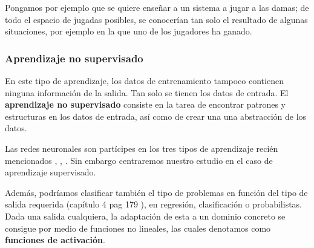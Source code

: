 Pongamos por ejemplo que se quiere enseñar a un sistema a jugar
a las damas; de todo el espacio de jugadas posibles, se conocerían tan solo el resultado de algunas situaciones, por ejemplo en la que uno de los jugadores ha ganado.  

\subsubsection{Aprendizaje no supervisado}  

En este tipo de aprendizaje, los datos de entrenamiento tampoco contienen ninguna información de la salida.
 Tan solo se tienen los datos de entrada. El \textbf{aprendizaje no supervisado} 
 consiste en la tarea de encontrar patrones y estructuras en los datos de entrada, 
 así como de crear una una abstracción de los datos.  


Las redes neuronales son partícipes en los tres tipos de aprendizaje 
recién mencionados
\cite{8612259}, \cite{DBLP:journals/corr/BakerGNR16}, \cite{10.5555/2955491.2955578}. Sin embargo centraremos nuestro estudio en el caso 
de aprendizaje supervisado. 

Además, podríamos clasificar también el tipo de problemas en función del tipo de salida requerida (capítulo 4 pag 179
\cite{BishopPaterRecognition}), en regresión, clasificación o probabilistas. 
Dada una salida cualquiera, la adaptación de esta a un dominio concreto se consigue por medio de funciones 
no lineales, las cuales denotamos como \textbf{funciones de activación}. 
